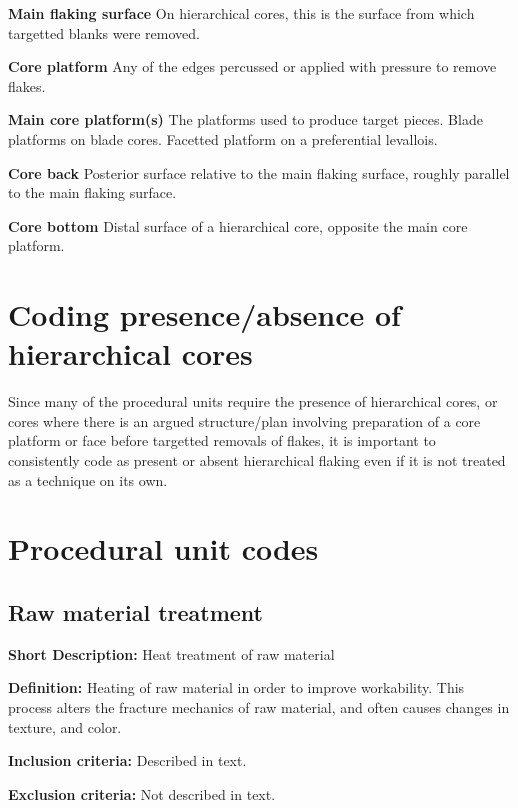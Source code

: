 \documentclass[
]{article}
\begin{document}
\textbf{Main flaking surface} On hierarchical cores, this is the surface
from which targetted blanks were removed.

\textbf{Core platform} Any of the edges percussed or applied with
pressure to remove flakes.

\textbf{Main core platform(s)} The platforms used to produce target
pieces. Blade platforms on blade cores. Facetted platform on a
preferential levallois.

\textbf{Core back} Posterior surface relative to the main flaking
surface, roughly parallel to the main flaking surface.

\textbf{Core bottom} Distal surface of a hierarchical core, opposite the
main core platform.

\hypertarget{coding-presenceabsence-of-hierarchical-cores}{%
\section{Coding presence/absence of hierarchical
cores}\label{coding-presenceabsence-of-hierarchical-cores}}

Since many of the procedural units require the presence of hierarchical
cores, or cores where there is an argued structure/plan involving
preparation of a core platform or face before targetted removals of
flakes, it is important to consistently code as present or absent
hierarchical flaking even if it is not treated as a technique on its
own.

\hypertarget{procedural-unit-codes}{%
\section{Procedural unit codes}\label{procedural-unit-codes}}

\hypertarget{raw-material-treatment}{%
\subsection{Raw material treatment}\label{raw-material-treatment}}

\textbf{Short Description:} Heat treatment of raw material

\textbf{Definition:} Heating of raw material in order to improve
workability. This process alters the fracture mechanics of raw material,
and often causes changes in texture, and color.

\textbf{Inclusion criteria:} Described in text.

\textbf{Exclusion criteria:} Not described in text.
\end{document}
